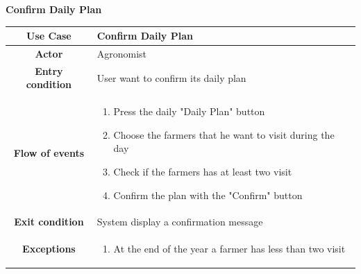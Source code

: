 \documentclass[table, 12pt]{article}
\begin{document}
\begin{itemize}
            \begin{table}[H]
                \item[] \textbf{Confirm Daily Plan}
                \item[] 
                \centering
                \begin{tabular}{|c| m{}|}
                    \hline
                    \textbf{Use Case} & Confirm Daily Plan\\ \hline
                    \textbf{Actor} & Agronomist\\ \hline
                    \textbf{Entry condition} & User want to confirm its daily plan\\  \hline
                    \textbf{Flow of events} & \begin{enumerate}
                                                \item Press the daily "Daily Plan" button
                                                \item Choose the farmers that he want to visit during the day
                                                \item Check if the farmers has at least two visit
                                                \item Confirm the plan with the "Confirm" button
                                            \end{enumerate}\\ \hline
                    \textbf{Exit condition} & System display a confirmation message\\ \hline
                    \textbf{Exceptions} &  \begin{enumerate}
                        \item At the end of the year a farmer has less than two visit
                    \end{enumerate}\\ \hline                    
                \end{tabular}
            \end{table}


\end{itemize}
\end{document}
